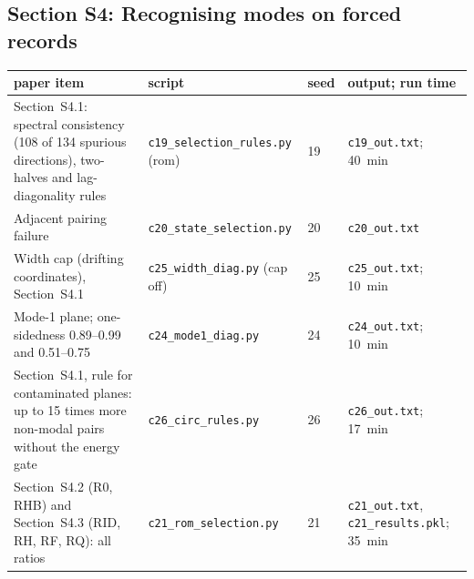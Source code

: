 \documentclass[10pt]{article}
\newcommand{\f}[1]{\texttt{#1}}
\begin{document}
\subsection*{Section S4: Recognising modes on forced records}
\begin{longtable}{L{0.31\textwidth}L{0.25\textwidth}L{0.08\textwidth}L{0.25\textwidth}}
\toprule
paper item & script & seed & output; run time\\ \midrule
Section~S4.1: spectral consistency (108 of 134 spurious directions), two-halves and lag-diagonality rules & \f{c19\_\allowbreak{}selection\_\allowbreak{}rules.py} (rom) & 19 & \f{c19\_\allowbreak{}out.txt}; 40~min\\
Adjacent pairing failure & \f{c20\_\allowbreak{}state\_\allowbreak{}selection.py} & 20 & \f{c20\_\allowbreak{}out.txt}\\
Width cap (drifting coordinates), Section~S4.1 & \f{c25\_\allowbreak{}width\_\allowbreak{}diag.py} (cap off) & 25 & \f{c25\_\allowbreak{}out.txt}; 10~min\\
Mode-1 plane; one-sidedness 0.89--0.99 and 0.51--0.75 & \f{c24\_\allowbreak{}mode1\_\allowbreak{}diag.py} & 24 & \f{c24\_\allowbreak{}out.txt}; 10~min\\
Section~S4.1, rule for contaminated planes: up to 15 times more non-modal pairs without the energy gate & \f{c26\_\allowbreak{}circ\_\allowbreak{}rules.py} & 26 & \f{c26\_\allowbreak{}out.txt}; 17~min\\
Section~S4.2 (R0, RHB) and Section~S4.3 (RID, RH, RF, RQ): all ratios & \f{c21\_\allowbreak{}rom\_\allowbreak{}selection.py} & 21 & \f{c21\_\allowbreak{}out.txt}, \f{c21\_\allowbreak{}results.pkl}; 35~min\\
\bottomrule
\end{longtable}
\end{document}
